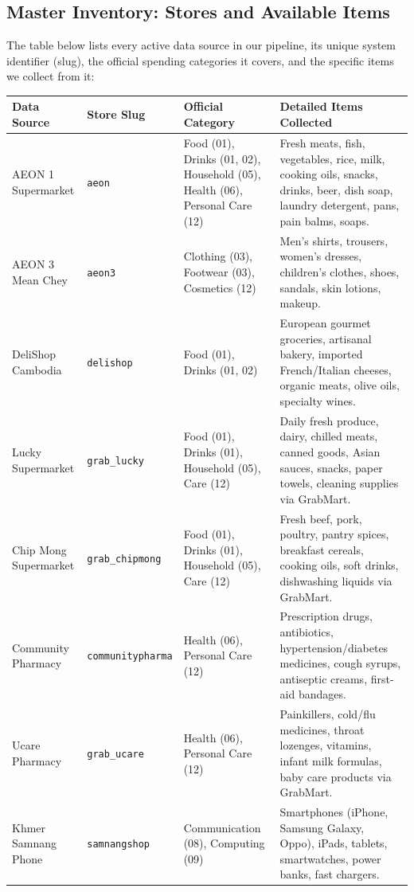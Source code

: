 \documentclass[11pt,a4paper,oneside]{article}
\begin{document}
\subsection{Master Inventory: Stores and Available Items}
The table below lists every active data source in our pipeline, its unique system identifier (slug), the official spending categories it covers, and the specific items we collect from it:

\begin{longtable}{p{3.2cm}p{2.3cm}p{3.0cm}p{6.0cm}}
\toprule
\textbf{Data Source} & \textbf{Store Slug} & \textbf{Official Category} & \textbf{Detailed Items Collected} \\
\midrule
\endhead
AEON 1 Supermarket & \texttt{aeon} & Food (01), Drinks (01, 02), Household (05), Health (06), Personal Care (12) & Fresh meats, fish, vegetables, rice, milk, cooking oils, snacks, drinks, beer, dish soap, laundry detergent, pans, pain balms, soaps. \\
AEON 3 Mean Chey & \texttt{aeon3} & Clothing (03), Footwear (03), Cosmetics (12) & Men's shirts, trousers, women's dresses, children's clothes, shoes, sandals, skin lotions, makeup. \\
DeliShop Cambodia & \texttt{delishop} & Food (01), Drinks (01, 02) & European gourmet groceries, artisanal bakery, imported French/Italian cheeses, organic meats, olive oils, specialty wines. \\
Lucky Supermarket & \texttt{grab\_lucky} & Food (01), Drinks (01), Household (05), Care (12) & Daily fresh produce, dairy, chilled meats, canned goods, Asian sauces, snacks, paper towels, cleaning supplies via GrabMart. \\
Chip Mong Supermarket & \texttt{grab\_chipmong} & Food (01), Drinks (01), Household (05), Care (12) & Fresh beef, pork, poultry, pantry spices, breakfast cereals, cooking oils, soft drinks, dishwashing liquids via GrabMart. \\
Community Pharmacy & \texttt{communitypharma} & Health (06), Personal Care (12) & Prescription drugs, antibiotics, hypertension/diabetes medicines, cough syrups, antiseptic creams, first-aid bandages. \\
Ucare Pharmacy & \texttt{grab\_ucare} & Health (06), Personal Care (12) & Painkillers, cold/flu medicines, throat lozenges, vitamins, infant milk formulas, baby care products via GrabMart. \\
Khmer Samnang Phone & \texttt{samnangshop} & Communication (08), Computing (09) & Smartphones (iPhone, Samsung Galaxy, Oppo), iPads, tablets, smartwatches, power banks, fast chargers. \\

\end{longtable}
\end{document}
